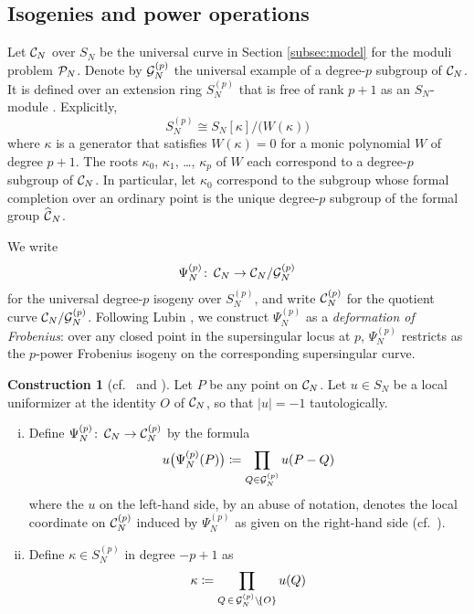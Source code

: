 \documentclass{gtpart}
\theoremstyle{definition}
\newtheorem{cstr}[equation]{Construction}
\theoremstyle{remark}
\def\co{\colon\thinspace}
\newcommand{\CC}{{\cal C}}
\newcommand{\CG}{{\cal G}}
\newcommand{\CP}{{\cal P}}
\newcommand{\HCC}{\widehat{~\!\!\CC}}
\newcommand{\K}{\kappa}
\newcommand{\ce}{\coloneqq}
\renewcommand{\=}{\approx}
\renewcommand{\-}{\sim}
\numberwithin{equation}{section}
\begin{document}
\subsection{Isogenies and power operations}
\label{subsec:po}

Let $\CC_N$ over $S_N$ be the universal curve in Section \ref{subsec:model} for 
the moduli problem $\CP_N$.  Denote by $\CG_N^{(p)}$ the universal example of a 
degree-$p$ subgroup of $\CC_N$.  It is defined over an extension ring 
$S_N^{(p)}$ that is free of rank $p + 1$ as an $S_N$-module 
\cite[Theorem 6.6.1]{KM}.  Explicitly, 
\[
 S_N^{(p)} \cong S_N[\K] / \big(W(\K)\big) 
\]
where $\K$ is a generator that satisfies $W(\K) = 0$ for a monic polynomial $W$ 
of degree $p + 1$.  The roots $\K_0$, $\K_1$, \ldots, $\K_p$ of $W$ each 
correspond to a degree-$p$ subgroup of $\CC_N$.  In particular, let $\K_0$ 
correspond to the subgroup whose formal completion over an ordinary point is the 
unique degree-$p$ subgroup of the formal group $\HCC_N$.  

We write 
\[
 \Psi_N^{(p)} \co \CC_N \to \CC_N / \CG_N^{(p)} 
\]
for the universal degree-$p$ isogeny over $S_N^{(p)}$, and write $\CC_N^{(p)}$ 
for the quotient curve $\CC_N / \CG_N^{(p)}$.  Following Lubin 
\cite[proof of Theorem 1.4]{Lubin67}, we construct $\Psi_N^{(p)}$ as a 
{\em deformation of Frobenius}: over any closed point in the supersingular locus 
at $p$, $\Psi_N^{(p)}$ restricts as the $p$-power Frobenius isogeny on the 
corresponding supersingular curve.  

\begin{cstr}[{cf.~\cite[proof of Theorem 1.4]{Lubin67} and 
\cite[Section 7.7]{KM}}]
 \label{cstr:Lubin}
 Let $P$ be any point on $\CC_N$.  Let $u \in S_N$ be a local uniformizer at the 
 identity $O$ of $\CC_N$, so that $|u| = -1$ tautologically.  
 \begin{enumerate}[(i)]
  \item  Define $\Psi_N^{(p)} \co \CC_N \to \CC_N^{(p)}$ by the formula 
  \[
   u\big(\Psi_N^{(p)}(P)\big) \ce \prod_{Q \in \CG_N^{(p)}} u(P - Q) 
  \]
  where the $u$ on the left-hand side, by an abuse of notation, denotes the 
  local coordinate on $\CC_N^{(p)}$ induced by $\Psi_N^{(p)}$ as given on the 
  right-hand side (cf.~\cite[Section 4.3]{Ando00}).  

  \item \label{K}  Define $\K \in S_N^{(p)}$ in degree $-p + 1$ as 
  \[
   \K \ce \prod_{Q \, \in \, \CG_N^{(p)} \setminus \! \{O\}} u(Q) 
  \]
 \end{enumerate}
\end{cstr}
\end{document}
